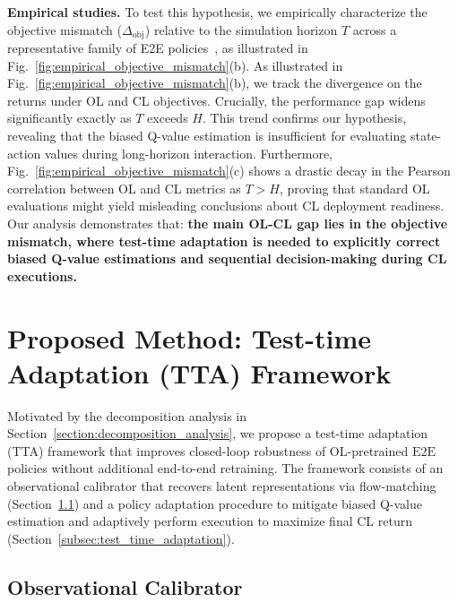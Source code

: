 \documentclass{article}
\begin{document}
\textbf{Empirical studies.} To test this hypothesis, we empirically characterize the objective mismatch ($\Delta_{\mathrm{obj}}$) relative to the simulation horizon $T$ across a representative family of E2E policies~\cite{diffusiondrive, diffusiondrivev2, transfuser, RAP}, as illustrated in Fig.~\ref{fig:empirical_objective_mismatch}(b). As illustrated in Fig.~\ref{fig:empirical_objective_mismatch}(b), we track the divergence on the returns under OL and CL objectives. Crucially, the performance gap widens significantly exactly as $T$ exceeds $H$. This trend confirms our hypothesis, revealing that the biased Q-value estimation is insufficient for evaluating state-action values during long-horizon interaction. Furthermore, Fig.~\ref{fig:empirical_objective_mismatch}(c) shows a drastic decay in the Pearson correlation between OL and CL metrics as $T > H$, proving that standard OL evaluations might yield misleading conclusions about CL deployment readiness. Our analysis demonstrates that: \textbf{the main OL-CL gap lies in the objective mismatch, where test-time adaptation is needed to explicitly correct biased Q-value estimations and sequential decision-making during CL executions.}


\section{Proposed Method: Test-time Adaptation (TTA) Framework}
\label{section:method}

Motivated by the decomposition analysis in Section~\ref{section:decomposition_analysis}, we propose a test-time adaptation (TTA) framework that improves closed-loop robustness of OL-pretrained $\text{E2E}$ policies without additional end-to-end retraining. The framework consists of an observational calibrator that recovers latent representations via flow-matching (Section~\ref{subsec:observational_calibrator}) and a policy adaptation procedure to mitigate biased Q-value estimation and adaptively perform execution to maximize final CL return (Section~\ref{subsec:test_time_adaptation}). 

\subsection{Observational Calibrator}
\label{subsec:observational_calibrator}
\end{document}

